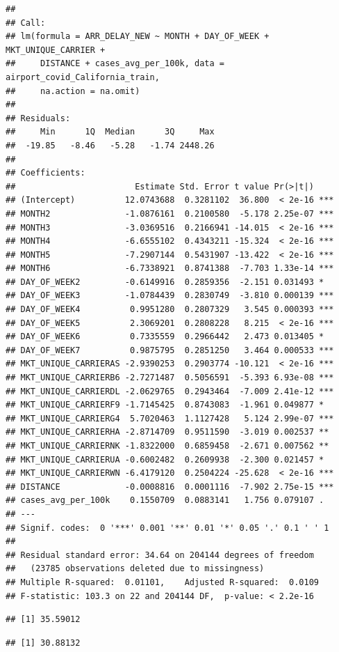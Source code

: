 \documentclass[
]{article}
\begin{document}
\begin{verbatim}
## 
## Call:
## lm(formula = ARR_DELAY_NEW ~ MONTH + DAY_OF_WEEK + MKT_UNIQUE_CARRIER + 
##     DISTANCE + cases_avg_per_100k, data = airport_covid_California_train, 
##     na.action = na.omit)
## 
## Residuals:
##     Min      1Q  Median      3Q     Max 
##  -19.85   -8.46   -5.28   -1.74 2448.26 
## 
## Coefficients:
##                        Estimate Std. Error t value Pr(>|t|)    
## (Intercept)          12.0743688  0.3281102  36.800  < 2e-16 ***
## MONTH2               -1.0876161  0.2100580  -5.178 2.25e-07 ***
## MONTH3               -3.0369516  0.2166941 -14.015  < 2e-16 ***
## MONTH4               -6.6555102  0.4343211 -15.324  < 2e-16 ***
## MONTH5               -7.2907144  0.5431907 -13.422  < 2e-16 ***
## MONTH6               -6.7338921  0.8741388  -7.703 1.33e-14 ***
## DAY_OF_WEEK2         -0.6149916  0.2859356  -2.151 0.031493 *  
## DAY_OF_WEEK3         -1.0784439  0.2830749  -3.810 0.000139 ***
## DAY_OF_WEEK4          0.9951280  0.2807329   3.545 0.000393 ***
## DAY_OF_WEEK5          2.3069201  0.2808228   8.215  < 2e-16 ***
## DAY_OF_WEEK6          0.7335559  0.2966442   2.473 0.013405 *  
## DAY_OF_WEEK7          0.9875795  0.2851250   3.464 0.000533 ***
## MKT_UNIQUE_CARRIERAS -2.9390253  0.2903774 -10.121  < 2e-16 ***
## MKT_UNIQUE_CARRIERB6 -2.7271487  0.5056591  -5.393 6.93e-08 ***
## MKT_UNIQUE_CARRIERDL -2.0629765  0.2943464  -7.009 2.41e-12 ***
## MKT_UNIQUE_CARRIERF9 -1.7145425  0.8743083  -1.961 0.049877 *  
## MKT_UNIQUE_CARRIERG4  5.7020463  1.1127428   5.124 2.99e-07 ***
## MKT_UNIQUE_CARRIERHA -2.8714709  0.9511590  -3.019 0.002537 ** 
## MKT_UNIQUE_CARRIERNK -1.8322000  0.6859458  -2.671 0.007562 ** 
## MKT_UNIQUE_CARRIERUA -0.6002482  0.2609938  -2.300 0.021457 *  
## MKT_UNIQUE_CARRIERWN -6.4179120  0.2504224 -25.628  < 2e-16 ***
## DISTANCE             -0.0008816  0.0001116  -7.902 2.75e-15 ***
## cases_avg_per_100k    0.1550709  0.0883141   1.756 0.079107 .  
## ---
## Signif. codes:  0 '***' 0.001 '**' 0.01 '*' 0.05 '.' 0.1 ' ' 1
## 
## Residual standard error: 34.64 on 204144 degrees of freedom
##   (23785 observations deleted due to missingness)
## Multiple R-squared:  0.01101,    Adjusted R-squared:  0.0109 
## F-statistic: 103.3 on 22 and 204144 DF,  p-value: < 2.2e-16
\end{verbatim}

\begin{verbatim}
## [1] 35.59012
\end{verbatim}

\begin{verbatim}
## [1] 30.88132
\end{verbatim}
\end{document}
